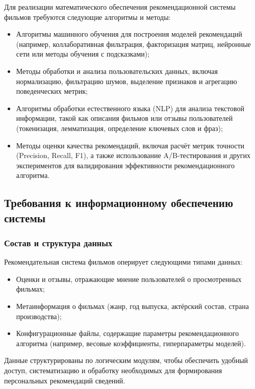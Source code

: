Для реализации математического обеспечения рекомендационной системы фильмов
требуются следующие алгоритмы и методы:

\begin{itemize}
	\item Алгоритмы машинного обучения для построения моделей рекомендаций
	(например, коллаборативная фильтрация, факторизация матриц,
	нейронные сети или методы обучения с подсказками);
	\item Методы обработки и анализа пользовательских данных, включая нормализацию,
	фильтрацию шумов, выделение признаков и агрегацию поведенческих метрик;
	\item Алгоритмы обработки естественного языка (NLP) для анализа текстовой информации,
	такой как описания фильмов или отзывы пользователей
	(токенизация, лемматизация, определение ключевых слов и фраз);
	\item Методы оценки качества рекомендаций, включая расчёт метрик точности (Precision, Recall, F1),
	а также использование A/B-тестирования и других экспериментов
	для валидирования эффективности рекомендационного алгоритма.
\end{itemize}

\subsection{Требования к информационному обеспечению системы}

\subsubsection{Состав и структура данных}

Рекомендательная система фильмов оперирует следующими типами данных:
\begin{itemize}
	\item Оценки и отзывы, отражающие мнение пользователей о просмотренных фильмах;
	\item Метаинформация о фильмах (жанр, год выпуска, актёрский состав, страна производства);
	\item Конфигурационные файлы, содержащие параметры рекомендационного алгоритма (например, весовые коэффициенты, гиперпараметры моделей).
\end{itemize}

Данные структурированы по логическим модулям, чтобы обеспечить удобный доступ,
систематизацию и обработку необходимых для формирования персональных рекомендаций сведений.

